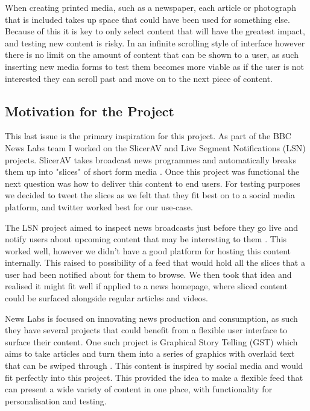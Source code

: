 \documentclass[12pt,titlepage]{article}
\begin{document}
  When creating printed media, such as a newspaper, each article or photograph
  that is included takes up space that could have been used for something else.
  Because of this it is key to only select content that will have the greatest
  impact, and testing new content is risky. In an infinite scrolling style of
  interface however there is no limit on the amount of content that can be shown
  to a user, as such inserting new media forms to test them becomes more viable
  as if the user is not interested they can scroll past and move on to the next
  piece of content.

  \subsection{Motivation for the Project}

  This last issue is the primary inspiration for this project. As part of the
  BBC News Labs team I worked on the SlicerAV and Live Segment Notifications
  (LSN) projects. SlicerAV takes broadcast news programmes and automatically
  breaks them up into "slices" of short form media \citep{slicer}. Once this
  project was functional the next question was how to deliver this content to
  end users. For testing purposes we decided to tweet the slices as we felt that
  they fit best on to a social media platform, and twitter worked best for our
  use-case.

  The LSN project aimed to inspect news broadcasts just before they go live and
  notify users about upcoming content that may be interesting to them
  \citep{lsn}. This worked well, however we didn't have a good platform for
  hosting this content internally. This raised to possibility of a feed that
  would hold all the slices that a user had been notified about for them to
  browse. We then took that idea and realised it might fit well if applied to a
  news homepage, where sliced content could be surfaced alongside regular
  articles and videos.

  News Labs is focused on innovating news production and consumption, as such
  they have several projects that could benefit from a flexible user interface
  to surface their content. One such project is Graphical Story Telling (GST)
  which aims to take articles and turn them into a series of graphics with
  overlaid text that can be swiped through \citep{gst}. This content is inspired
  by social media and would fit perfectly into this project. This provided the
  idea to make a flexible feed that can present a wide variety of content in one
  place, with functionality for personalisation and testing.
\end{document}
